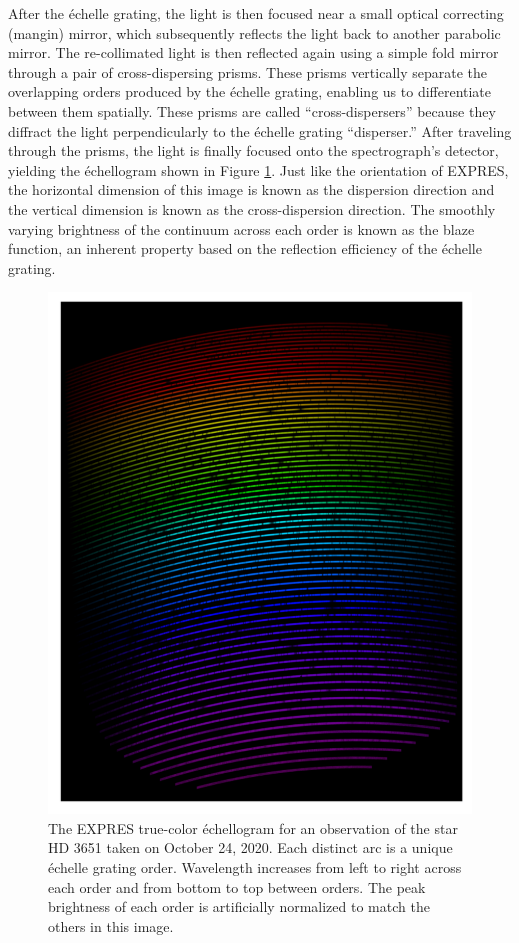 After the \'echelle grating, the light is then focused near a small optical correcting (mangin) mirror, which subsequently reflects the light back to another parabolic mirror. The re-collimated light is then reflected again using a simple fold mirror through a pair of cross-dispersing prisms. These prisms vertically separate the overlapping orders produced by the \'echelle grating, enabling us to differentiate between them spatially. These prisms are called ``cross-dispersers'' because they diffract the light perpendicularly to the \'echelle grating ``disperser.'' After traveling through the prisms, the light is finally focused onto the spectrograph's detector, yielding the \'echellogram shown in Figure \ref{fig:expres-format}. Just like the orientation of EXPRES, the horizontal dimension of this image is known as the dispersion direction and the vertical dimension is known as the cross-dispersion direction. The smoothly varying brightness of the continuum across each order is known as the blaze function, an inherent property based on the reflection efficiency of the \'echelle grating.

\begin{figure}
    \centering
    \includegraphics[width=\textwidth]{figures-1/expres-format.pdf}
    \caption[The EXPRES \'echelleogram]{The EXPRES true-color \'echellogram for an observation of the star HD 3651 taken on October 24, 2020. Each distinct arc is a unique \'echelle grating order. Wavelength increases from left to right across each order and from bottom to top between orders. The peak brightness of each order is artificially normalized to match the others in this image.}
    \label{fig:expres-format}
\end{figure}


